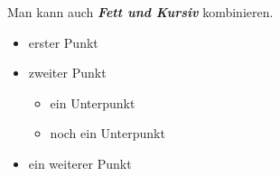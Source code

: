 Man kann auch \textbf{\textit{Fett und Kursiv}} kombinieren.

\begin{itemize}
    \item erster Punkt
    \item zweiter Punkt
    \begin{itemize}
        \item ein Unterpunkt
        \item noch ein Unterpunkt
    \end{itemize}
    \item ein weiterer Punkt
\end{itemize}